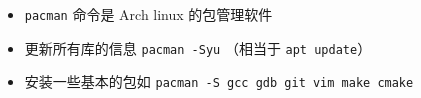 
\begin{issues}
\issueDraft
\end{issues}

\begin{itemize}
\item \verb|pacman| 命令是 Arch linux 的包管理软件
\item 更新所有库的信息 \verb|pacman -Syu| （相当于 \verb|apt update|）
\item 安装一些基本的包如 \verb|pacman -S gcc gdb git vim make cmake|
\end{itemize}

